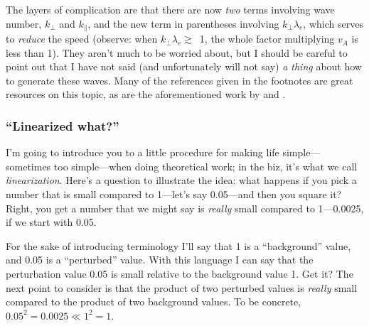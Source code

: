 The layers of complication are that there are now \emph{two} terms involving
wave number, $k_\perp$ and $k_\parallel$, and the new term in parentheses
involving $k_\perp \lambda_e$, which serves to \emph{reduce} the \Alf speed
(observe: when $k_\perp \lambda_e \gtrsim$~1, the whole factor multiplying $v_A$
is less than 1). They aren't much to be worried about, but I should be careful
to point out that I have not said (and unfortunately will not say) \emph{a
  thing} about how to generate these waves. Many of the references given in the
footnotes are great resources on this topic, as are the aforementioned work by
\citet{Lysak1996} and \citet{Genot2004a}.




\subsubsection{``Linearized what?''}

I'm going to introduce you to a little procedure for making life
simple---sometimes too simple---when doing theoretical work; in the biz, it's
what we call \emph{linearization}. Here's a question to illustrate the idea:
what happens if you pick a number that is small compared to 1---let's say
0.05---and then you square it? Right, you get a number that we might say is
\emph{really} small compared to 1---0.0025, if we start with 0.05.

For the sake of introducing terminology I'll say that 1 is a ``background''
value, and 0.05 is a ``perturbed'' value. With this language I can say that the
perturbation value 0.05 is small relative to the background value 1. Get it?
The next point to consider is that the product of two perturbed values is
\emph{really} small compared to the product of two background values. To be
concrete, $0.05^2 = 0.0025 \ll 1^2 = 1$.


